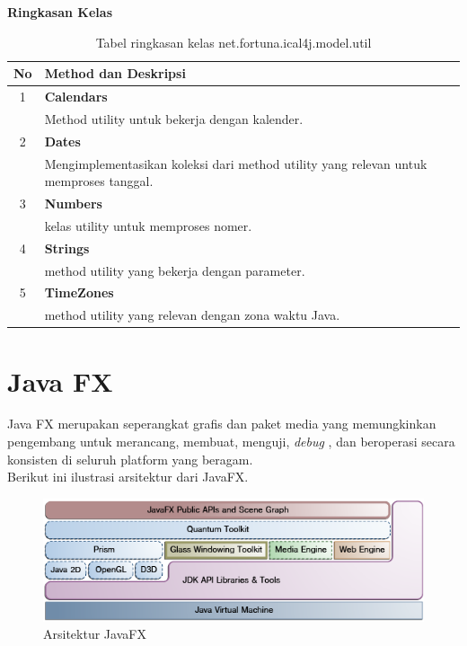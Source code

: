 	\noindent \textbf{Ringkasan Kelas}\cite{ical}
	\begin{table}[H]
		\centering
		\caption{Tabel ringkasan kelas net.fortuna.ical4j.model.util}
		\label{tab:kelas_net.fortuna.ical4j.model.util}
	\begin{tabular}{|c|p{12cm}|}
		\hline
		\textbf{No} & \textbf{Method dan Deskripsi} \\ \hline \hline
		1 & \textbf{Calendars}\\
			&	Method utility untuk bekerja dengan kalender.\\ \hline
		2 & \textbf{Dates}\\
			&	Mengimplementasikan koleksi dari method utility yang relevan untuk memproses tanggal. \\ \hline
		3 & \textbf{Numbers}\\
			&	kelas utility untuk memproses nomer. \\ \hline
		4 & \textbf{Strings}\\
			&	method utility yang bekerja dengan parameter. \\ \hline
		5 & \textbf{TimeZones}\\
			&	method utility yang relevan dengan zona waktu Java. \\ \hline
		\end{tabular}
\end{table}

\section{Java FX}
\label{sec:JavaFX}
Java FX merupakan seperangkat grafis dan paket media yang memungkinkan pengembang untuk merancang, membuat, menguji, \textit{debug} , dan  beroperasi secara konsisten di seluruh platform yang beragam\cite{javafx2}.\\
Berikut ini ilustrasi arsitektur dari JavaFX.
\begin{figure}[H]
	\centering
	\includegraphics[scale=0.7]{Gambar/arsitekturJavaFX}
	\caption{Arsitektur JavaFX}
	\end{figure}
	
